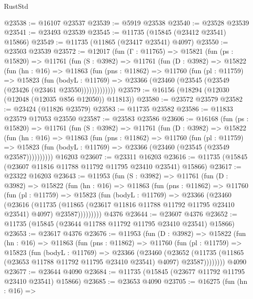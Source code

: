 \begin{lexlean}{RustStd}
\begin{coremodule}
@23538 := @16107 @23537
@23539 := @5919 @23538
@23540 := @23528 @23539
@23541 := @23493 @23539
@23545 := @11735 (@15845 (@23412 @23541) @15866)
@23549 := @11735 (@11865 (@23417 @23541) @4097)
@23550 := @23503 @23539
@23572 := @12017
    (fun (Γ : @11765) =>
    @15821
      (fun (ps : @15820) =>
      @11761
        (fun (S : @3982) =>
        @11761
          (fun (D : @3982) =>
          @15822
            (fun (hn : @16) =>
            @11863
              (fun (pns : @11862) =>
              @11760
                (fun (pl : @11759) =>
                @15823
                  (fun (bodyL : @11769) =>
                  @23366 (@23460 (@23545 (@23549 (@23426 (@23461 @23550)))))))))))))
@23579 := @16156 (@18294 (@12030 (@12048 (@12035 @856 @12050)) @11813))
@23580 := @23572 @23579
@23582 := @23424 (@11826 @23579)
@23583 := @11735 @23582
@23586 := @11833 @23579 @17053 @23550
@23587 := @23583 @23586
@23606 := @16168
    (fun (ps : @15820) =>
    @11761
      (fun (S : @3982) =>
      @11761
        (fun (D : @3982) =>
        @15822
          (fun (hn : @16) =>
          @11863
            (fun (pns : @11862) =>
            @11760
              (fun (pl : @11759) =>
              @15823 (fun (bodyL : @11769) => @23366 (@23460 (@23545 (@23549 @23587))))))))))
    @16203
@23607 := @23311 @16203
@23616 := @11735 (@15845 (@23607 @11816 @11788 @11792 @11795 @23410 @23541) @15866)
@23617 := @23322 @16203
@23643 := @11953
    (fun (S : @3982) =>
    @11761
      (fun (D : @3982) =>
      @15822
        (fun (hn : @16) =>
        @11863
          (fun (pns : @11862) =>
          @11760
            (fun (pl : @11759) =>
            @15823
              (fun (bodyL : @11769) =>
              @23366
                (@23460
                  (@23616
                    (@11735
                      (@11865 (@23617 @11816 @11788 @11792 @11795 @23410 @23541) @4097)
                      @23587)))))))))
    @4376
@23644 := @23607 @4376
@23652 := @11735 (@15845 (@23644 @11788 @11792 @11795 @23410 @23541) @15866)
@23653 := @23617 @4376
@23676 := @11953
    (fun (D : @3982) =>
    @15822
      (fun (hn : @16) =>
      @11863
        (fun (pns : @11862) =>
        @11760
          (fun (pl : @11759) =>
          @15823
            (fun (bodyL : @11769) =>
            @23366
              (@23460
                (@23652
                  (@11735 (@11865 (@23653 @11788 @11792 @11795 @23410 @23541) @4097) @23587))))))))
    @4090
@23677 := @23644 @4090
@23684 := @11735 (@15845 (@23677 @11792 @11795 @23410 @23541) @15866)
@23685 := @23653 @4090
@23705 := @16275
    (fun (hn : @16) =>

\end{coremodule}
\end{lexlean}
